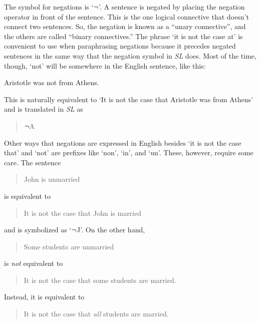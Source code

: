 \documentclass[../logic-text.tex]{subfiles}
\begin{document}
The symbol for negations is \enquote*{\(\neg\)}. A sentence is negated by placing the negation operator in front of the sentence. This is the one logical connective that doesn't connect two sentences. So, the negation is known as a \enquote{unary connective}, and the others are called \enquote{binary connectives.}   The phrase \enquote*{it is not the case at} is convenient to use when paraphrasing negations because it precedes negated sentences in the same way that the negation symbol in \emph{SL} does. Most of the time, though, \enquote*{not} will be somewhere in the English sentence, like this:

Aristotle was not from Athens.

This is naturally equivalent to \enquote*{It is not the case that Aristotle was from Athens} and is translated in \emph{SL} as



\begin{quote}
  \(\neg\)A
\end{quote}

Other ways that negations are expressed in English besides \enquote*{it is not the case that} and \enquote*{not} are prefixes like \enquote*{non}, \enquote*{in}, and \enquote*{un}. These, however, require some care. The sentence


\begin{quote}
  John is unmarried
\end{quote}

\noindent is equivalent to

\begin{quote}
  It is not the case that John is married
\end{quote}

\noindent and is symbolized as \enquote*{\(\neg\)J}.
On the other hand,

\begin{quote}
  Some students are unmarried
\end{quote}

\noindent is \emph{not} equivalent to

\begin{quote}
  It is not the case that some students are married.
\end{quote}

\noindent Instead, it is equivalent to

\begin{quote}
  It is not the case that \emph{all} students are married.
\end{quote}
\end{document}
